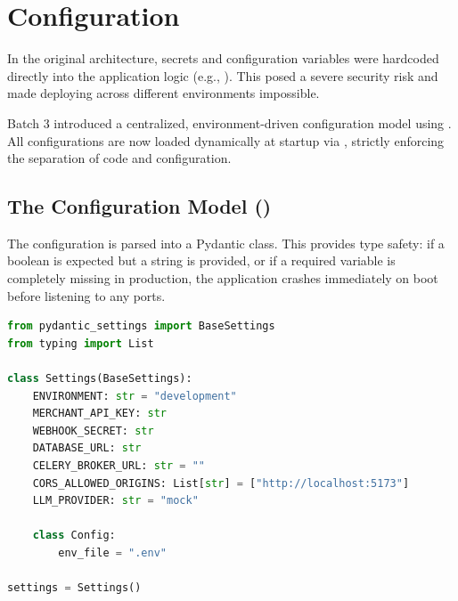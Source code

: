 
\section{Configuration}

\begin{tcolorbox}[summarybox={\iconGear[1.5] Centralized Environment Control}]
\color{textdark}
In the original architecture, secrets and configuration variables were hardcoded directly into the application logic (e.g., ). This posed a severe security risk and made deploying across different environments impossible.

Batch 3 introduced a centralized, environment-driven configuration model using . All configurations are now loaded dynamically at startup via , strictly enforcing the separation of code and configuration.
\end{tcolorbox}

\vspace{0.8cm}

\subsection{The Configuration Model ()}

The configuration is parsed into a Pydantic  class. This provides type safety: if a boolean is expected but a string is provided, or if a required variable is completely missing in production, the application crashes immediately on boot before listening to any ports.

\begin{tcolorbox}[codebox={Pydantic Settings Definition}]
\begin{lstlisting}[language=Python]
from pydantic_settings import BaseSettings
from typing import List

class Settings(BaseSettings):
    ENVIRONMENT: str = "development"
    MERCHANT_API_KEY: str
    WEBHOOK_SECRET: str
    DATABASE_URL: str
    CELERY_BROKER_URL: str = ""
    CORS_ALLOWED_ORIGINS: List[str] = ["http://localhost:5173"]
    LLM_PROVIDER: str = "mock"

    class Config:
        env_file = ".env"

settings = Settings()
\end{lstlisting}
\end{tcolorbox}

